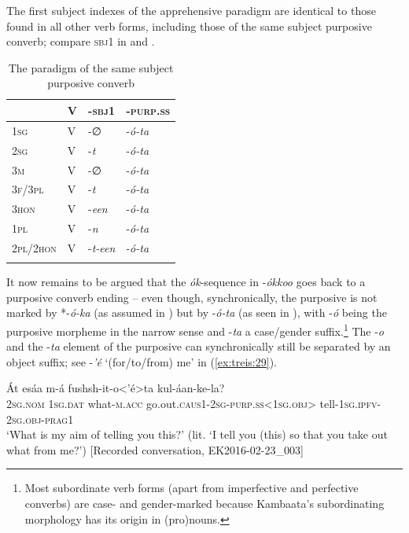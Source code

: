 \documentclass[output=paper,colorlinks,citecolor=brown,
]{langsci/langscibook}
\begin{document}
The first subject indexes of the apprehensive paradigm are identical to those found in all other verb forms, including those of the same subject purposive converb; compare \textsc{sbj1} in  and .

\begin{table}
    \begin{tabular}{llll}
\lsptoprule
&  V & -\textsc{sbj1} & -\textsc{purp.ss}\\
\midrule
\textsc{1sg} & V & -∅ & -\textit{ó-ta}\\
\textsc{2sg} & V &	-\textit{t}	& -\textit{ó-ta}\\
\textsc{3m}	& V & -∅ & -\textit{ó-ta}\\
\textsc{3f/3pl} & V & -\textit{t} & -\textit{ó-ta}\\
\textsc{3hon} & V & -\textit{een} &	-\textit{ó-ta}\\
\textsc{1pl} & V & 	-\textit{n} & -\textit{ó-ta}\\
\textsc{2pl/2hon} & V &	-\textit{t-een} & -\textit{ó-ta}\\
\lspbottomrule
\end{tabular}
    \caption{The paradigm of the same subject purposive converb}
    \label{tab:treis:6}
\end{table}

It now remains to be argued that the \textit{ók}-sequence in \nobreakdash-\textit{ókkoo} goes back to a purposive converb ending -- even though, synchronically, the purposive is not marked by *-\textit{ó-ka} (as assumed in ) but by \nobreakdash-\textit{ó-ta} (as seen in ), with \nobreakdash-\textit{ó} being the purposive morpheme in the narrow sense and \nobreakdash-\textit{ta} a case\slash gender suffix.\footnote{Most subordinate verb forms (apart from imperfective and perfective converbs) are case- and gender-marked because Kambaata's subordinating morphology has its origin in (pro)nouns.} The \nobreakdash-\textit{o} and the \nobreakdash-\textit{ta} element of the purposive can synchronically still be separated by an object suffix; see \nobreakdash-\textit{'é} `(for\slash to\slash from) me' in (\ref{ex:treis:29}).

\ea\label{ex:treis:29}
\gll Át esáa m-á fushsh-it-o<'é>ta kul-áan-ke-la?\\
\textsc{2sg.nom} \textsc{1sg.dat} what-\textsc{m.acc}	go.out.\textsc{caus1-2sg-purp.ss<1sg.obj>} tell-\textsc{1sg.ipfv-2sg.obj-prag1}\\
\glt `What is my aim of telling you this?' (lit. `I tell you (this) so that you take out what from me?')   [Recorded conversation, EK2016-02-23\_003]
\z 
\end{document}
